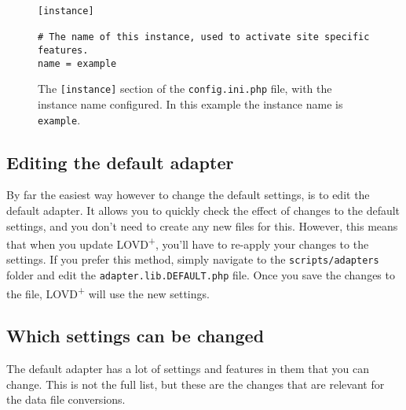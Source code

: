 \begin{figure}[ht]
  \begin{shaded}
    \small
    \begin{verbatim}
[instance]

# The name of this instance, used to activate site specific features.
name = example
\end{verbatim}
  \caption{%
    The \texttt{[instance]} section of the \texttt{config.ini.php} file, with the instance name configured.
    In this example the instance name is \texttt{example}.}
    \label{fig:adapters_instance_name}
  \end{shaded}
\end{figure}



\subsection{Editing the default adapter}
\label{ssec:adapters_editing_the_default}
By far the easiest way however to change the default settings, is to edit the default adapter.
It allows you to quickly check the effect of changes to the default settings,
 and you don't need to create any new files for this.
However, this means that when you update LOVD\textsuperscript{+}, you'll have to re-apply your changes to the settings.
If you prefer this method, simply navigate to the \texttt{scripts/adapters}
 folder and edit the \texttt{adapter.lib.DEFAULT.php} file.
Once you save the changes to the file, LOVD\textsuperscript{+} will use the new settings.
\clearpage %



\subsection{Which settings can be changed}
\label{ssec:adapters_which_settings}
The default adapter has a lot of settings and features in them that you can change.
This is not the full list, but these are the changes that are relevant for the data file conversions.


